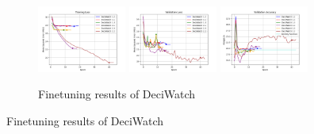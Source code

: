 \documentclass{beamer}
\begin{document}
\begin{frame}
\begin{figure}[htbp]
        \begin{subfigure}[b]{\textwidth}
            \centering
            \includegraphics[width=0.32\textwidth]{./entities/finetuned_new/deciwatch/train_losses.png}
            \includegraphics[width=0.32\textwidth]{./entities/finetuned_new/deciwatch/val_losses.png}
            \includegraphics[width=0.32\textwidth]{./entities/finetuned_new/deciwatch/val_accs.png}
            \caption{Finetuning results of DeciWatch}
        \end{subfigure}
        \hfill
    \end{figure}
\end{frame}
\end{document}
